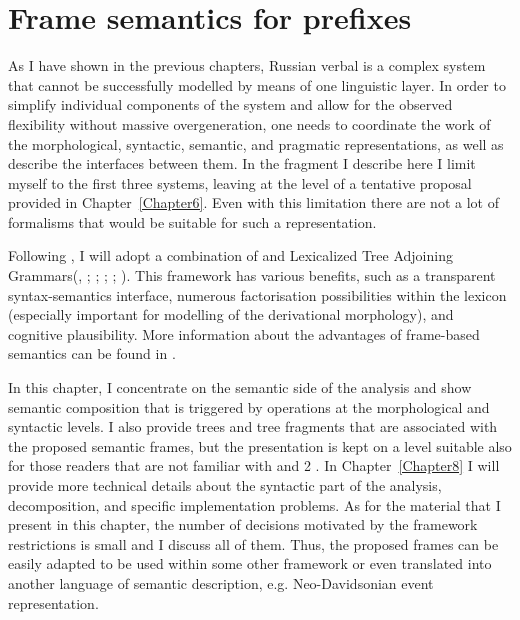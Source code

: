 
\chapter{Frame semantics for prefixes} %
\label{Chapter7}

As I have shown in the previous chapters, Russian verbal  is a complex system that cannot be successfully modelled by means of one linguistic layer. In order to simplify individual components of the system and allow for the observed flexibility without massive overgeneration, one needs to coordinate the work of the morphological, syntactic, semantic, and pragmatic representations, as well as describe the interfaces between them. In the fragment I describe here I limit myself to the first three systems, leaving  at the level of a tentative proposal provided in Chapter~\ref{Chapter6}. Even with this limitation there are not a lot of formalisms that would be suitable for such a representation.

Following \citet{KallmeyerOsswald:12, KallmeyerOsswald:13}, I will adopt a combination of  \citep{Fillmore:82} and Lexicalized Tree Adjoining Grammars\linebreak (, \citealt{JoshiSchabes:97}; \citealt{Frank:92}; \citealt{AbeilleRambow:00}; \citealt{Abeille:02}; \citealt{Frank:02}). This framework has various benefits, such as a transparent syntax-se\-man\-tics interface, numerous factorisation possibilities within the lexicon (especially important for modelling of the derivational morphology), and cognitive plausibility. More information about the advantages of frame-based  semantics can be found in \citet{KallmeyerOsswald:13}. 

In this chapter, I concentrate on the semantic side of the analysis and show semantic composition that is triggered by operations at the morphological and syntactic levels. I also provide trees and tree fragments that are associated with the proposed semantic frames, but the presentation is kept on a level suitable also for those readers that are not familiar with  and  2 \citep{Petitjean:16}. In Chapter~\ref{Chapter8} I will provide more technical details about the syntactic part of the analysis,  decomposition, and specific implementation problems. As for the material that I present in this chapter, the number of decisions motivated by the framework restrictions is small and I discuss all of them. Thus, the proposed frames can be easily adapted to be used within some other framework or even translated into another language of semantic description, e.g. Neo-Davidsonian event representation.

